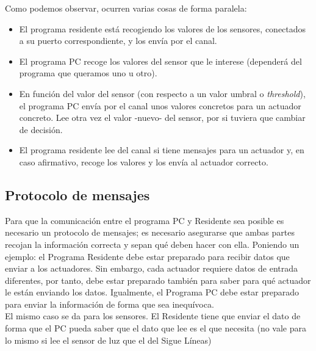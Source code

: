Como podemos observar, ocurren varias cosas de forma paralela:
\begin{itemize}
	\item El programa residente está recogiendo los valores de los sensores, conectados a su puerto correspondiente, y los envía por el canal.
	\item El programa PC recoge los valores del sensor que le interese (dependerá del programa que queramos uno u otro).
	\item En función del valor del sensor (con respecto a un valor umbral o \textit{threshold}), el programa PC envía por el canal unos valores concretos para un actuador concreto. Lee otra vez el valor -nuevo- del sensor, por si tuviera que cambiar de decisión.
	\item El programa residente lee del canal si tiene mensajes para un actuador y, en caso afirmativo, recoge los valores y los envía al actuador correcto.
\end{itemize}

\subsection{Protocolo de mensajes}\label{subsec:protocolomensajes}
Para que la comunicación entre el programa PC y Residente sea posible es necesario un protocolo de mensajes; es necesario asegurarse que ambas partes recojan la información correcta y sepan qué deben hacer con ella. Poniendo un ejemplo: el Programa Residente debe estar preparado para recibir datos que enviar a los actuadores. Sin embargo, cada actuador requiere datos de entrada diferentes, por tanto, debe estar preparado también para saber para qué actuador le están enviando los datos. Igualmente, el Programa PC debe estar preparado para enviar la información de forma que sea inequívoca. \\
El mismo caso se da para los sensores. El Residente tiene que enviar el dato de forma que el PC pueda saber que el dato que lee es el que necesita (no vale para lo mismo si lee el sensor de luz que el del Sigue Líneas) \\

